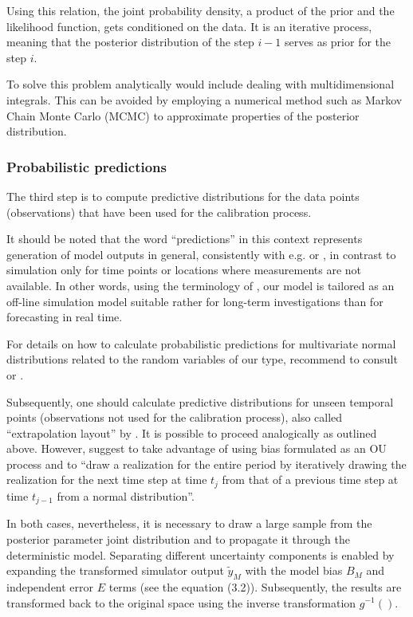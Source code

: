 \documentclass{ctuthesis}\usepackage[]{graphicx}\usepackage[]{color}
\begin{document}
Using this relation, the joint probability density, a product of the prior and the likelihood function, gets conditioned on the data. It is an iterative process, meaning that the posterior distribution of the step $i-1$ serves as prior for the step $i$.

To solve this problem analytically would include dealing with multidimensional integrals. This can be avoided by employing a numerical method such as Markov Chain Monte Carlo (MCMC) to approximate properties of the posterior distribution. 



\subsubsection{Probabilistic predictions}
The third step is to compute predictive distributions for the data points (observations) that have been used for the calibration process. 

It should be noted that the word \enquote{predictions} in this context represents  generation of model outputs in general, consistently with e.g. \cite{reichert2012linking} or \cite{giudice2013improving}, in contrast to simulation only for time points or locations where measurements are not available. In other words, using the terminology of \cite{breinholt2012formal}, our model is tailored as an off-line simulation model suitable rather for long-term investigations than for forecasting in  real time.

For details on how to calculate probabilistic predictions for multivariate normal distributions related to the random variables of our type,  \cite{giudice2013improving} recommend to consult \cite{kendall1994vol} or \cite{kollo2006advanced}.

Subsequently, one should calculate predictive distributions for unseen temporal points (observations not used for the calibration process), also called \enquote{extrapolation layout} by \cite{giudice2013improving}. It is possible to proceed analogically as outlined above. However, \cite{giudice2013improving} suggest to take advantage of using bias formulated as an  OU process and to \enquote{draw a realization for the entire period by iteratively drawing the realization for the next time step at time   $t_ j$ from that of a previous time step at time $t_ {j-1}$ from a normal distribution}.

In both cases, nevertheless, it is necessary to draw a large sample from the  posterior parameter joint distribution and to propagate it through the deterministic model. Separating different uncertainty components is enabled by expanding the transformed simulator output $\tilde{y}_M$ with the model bias $B_M$ and independent error $E$ terms (see the equation (3.2)). Subsequently, the results are transformed back to the original space using the inverse transformation $g^{-1}()$.
\end{document}
